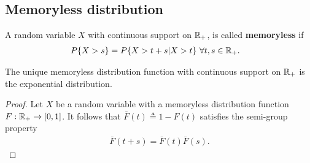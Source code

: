 \documentclass[a4paper,10pt,english]{article}
\begin{document}
\subsection{Memoryless distribution}
A random variable $X$ with continuous support on $\mathbb{R}_+$, is called \textbf{memoryless} if %
\begin{align*}
  P\{X>s\} &= P\{ X > t+s| X>t\}~\forall t,s \in \R_+.%
\end{align*}
\begin{prop} The unique memoryless distribution function with continuous support on $\mathbb{R}_+$ is the exponential distribution.
\end{prop}
\begin{proof}
Let $X$ be a random variable with a memoryless distribution function $F: \mathbb{R}_+ \to [0,1]$.  
It follows that $\bar{F}(t) \triangleq 1 - F(t)$ satisfies the semi-group property 
\begin{align*}
 \bar{F}(t+s) = \bar{F}(t)\bar{F}(s).
\end{align*}
%

\end{proof}
\end{document}
